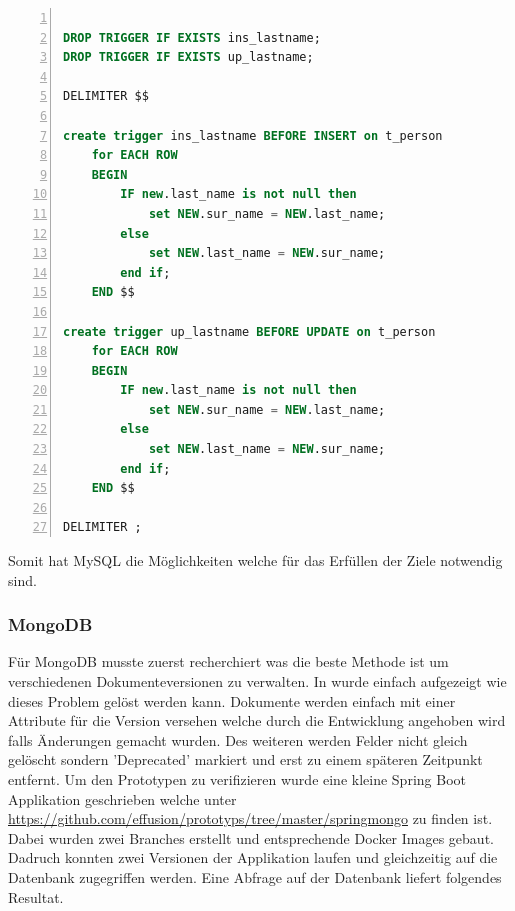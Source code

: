 \begin{lstlisting}[language=SQL, showspaces=false, basicstyle=\ttfamily, numbers=left, numberstyle=\tiny, commentstyle=\color{gray}]

DROP TRIGGER IF EXISTS ins_lastname;
DROP TRIGGER IF EXISTS up_lastname;

DELIMITER $$

create trigger ins_lastname BEFORE INSERT on t_person 
	for EACH ROW
	BEGIN
		IF new.last_name is not null then
			set NEW.sur_name = NEW.last_name;
		else
			set NEW.last_name = NEW.sur_name;
		end if;
	END $$

create trigger up_lastname BEFORE UPDATE on t_person
	for EACH ROW
	BEGIN
		IF new.last_name is not null then
			set NEW.sur_name = NEW.last_name;
		else
			set NEW.last_name = NEW.sur_name;
		end if;
	END $$

DELIMITER ;

\end{lstlisting}
Somit hat MySQL die Möglichkeiten welche für das Erfüllen der Ziele notwendig sind.
\newpage
\subsubsection{MongoDB}

Für MongoDB musste zuerst recherchiert was die beste Methode ist um verschiedenen Dokumenteversionen zu verwalten. In \cite{mongoschema} wurde einfach aufgezeigt wie dieses Problem gelöst werden kann. Dokumente werden einfach mit einer Attribute für die Version versehen welche durch die Entwicklung angehoben wird falls Änderungen gemacht wurden. Des weiteren werden Felder nicht gleich gelöscht sondern 'Deprecated' markiert und erst zu einem späteren Zeitpunkt entfernt. Um den Prototypen zu verifizieren wurde eine kleine Spring Boot Applikation geschrieben welche unter \url{https://github.com/effusion/prototyps/tree/master/springmongo} zu finden ist. Dabei wurden zwei Branches erstellt und entsprechende Docker Images gebaut. Dadruch konnten zwei Versionen der Applikation laufen und gleichzeitig auf die Datenbank zugegriffen werden. 
Eine Abfrage auf der Datenbank liefert folgendes Resultat.


